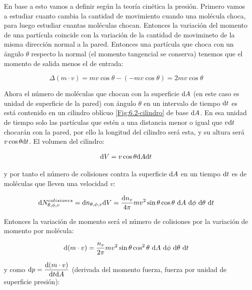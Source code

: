 \documentclass[12pt,a4paper,oneside]{book}
\begin{document}
En base a esto vamos a definir según la teoría cinética la presión. Primero vamos a estudiar cuanto cambia la cantidad de movimiento cuando una molécula choca, para luego estudiar cuantas moléculas chocan. Entonces la variación del momento de una partícula coincide con la variación de la cantidad de movimineto de la misma dirección normal a la pared. Entonces una partícula que choca con un ángulo $\theta$ respecto la normal (el momento tangencial se conserva) tenemos que el momento de salida menos el de entrada: 

\newpage

\begin{equation}
\Delta (m \cdot v) = m v \cos \theta - (- m v \cos \theta) = 2 m v \cos \theta
\end{equation}



Ahora el número de moléculas que chocan con la superficie $\mathrm{d} A$ (en este caso es unidad de superficie de la pared) con ángulo $\theta$  en un intervalo de tiempo $\mathrm{d} t$ es está contenido en un cilindro oblícuo \ref{Fig:6.2-cilindro} de base $\mathrm{d} A$. En esa unidad de tiempo solo las partículas que estén a una distancia menor o igual que $v \mathrm{d} t$ chocarán con la pared, por ello la longitud del cilindro será esta, y su altura será $ v \cos \theta \mathrm{d} t$. El volumen del cilindro:

\begin{equation}
\mathrm{d} V = v \cos \theta \mathrm{d} A  \mathrm{d} t
\end{equation} 

y por tanto el número de colisiones contra la superficie $\mathrm{d} A$ en un tiempo $\mathrm{d} t$ es de moléculas que lleven una velocidad $v$:

\begin{equation}
\mathrm{d} N_ {\theta, \phi, v}^{colisiones} = \mathrm{d} n_{\theta, \phi,v} \mathrm{d} V = \dfrac{\mathrm{d} n_v}{4 \pi} m v^2 \sin \theta  \cos \theta \ \mathrm{d} A \ \mathrm{d} \phi \ \mathrm{d} \theta \ \mathrm{d} t
\end{equation}

Entonces la variación de momento será el número de colisiones por la variación de momento por molécula:

\begin{equation}
\mathrm{d} (m \cdot v) = \dfrac{n_v}{2 \pi} m v^2 \sin \theta \cos^2 \theta\ \mathrm{d} A \ \mathrm{d} \phi \ \mathrm{d} \theta \ \mathrm{d} t
\end{equation}

y como $\mathrm{d} p = \dfrac{\mathrm{d} (m \cdot v)}{\mathrm{d} t \mathrm{d} A}$ (derivada del momento fuerza, fuerza por unidad de superficie presión):
\end{document}
